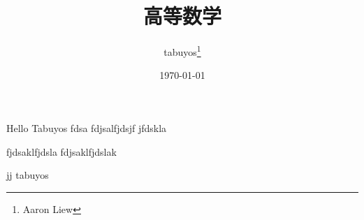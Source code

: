 \documentclass[a4paper,zihao=-4,openany,UTF8]{ctexbook}
\title{高等数学}
\author{tabuyos\thanks{Aaron Liew}}
\date{\today}
\begin{document}
\maketitle
Hello Tabuyos
\newpage
fdsa
\newpage
fdjsalfjdsjf jfdskla

fjdsaklfjdsla
\newpage
fdjsaklfjdslak

jj
\newpage
tabuyos
\end{document}
